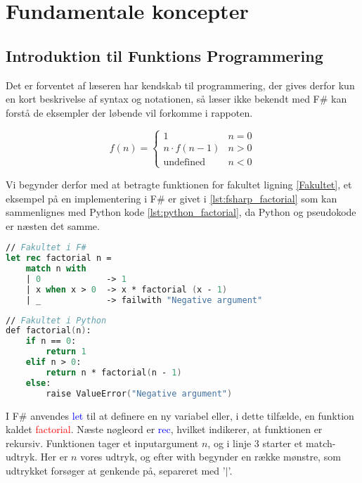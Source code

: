 
\section{Fundamentale koncepter}
\subsection{Introduktion til Funktions Programmering}

Det er forventet af læseren har kendskab til programmering, der gives derfor kun en kort beskrivelse af syntax og notationen, så læser ikke bekendt med F\# kan forstå de eksempler der løbende vil forkomme i rappoten.

\begin{equation}
    \label{Fakultet}
    f(n) = \begin{cases} 
            1 &  n = 0  \\
            n \cdot f(n-1) & n > 0 \\
            \text{undefined} & n < 0 
           \end{cases}
\end{equation}

Vi begynder derfor med at betragte funktionen for fakultet ligning \ref{Fakultet}, et eksempel på en implementering i F\# er givet i \ref{lst:fsharp_factorial} som kan sammenlignes med Python kode \ref{lst:python_factorial}, da Python og pseudokode er næsten det samme. 

\begin{lstlisting}[language={FSharp}, label={lst:fsharp_factorial}, caption={Eksempel på Fakultet i F\#}]
// Fakultet i F#
let rec factorial n =
    match n with
    | 0             -> 1 
    | x when x > 0  -> x * factorial (x - 1)
    | _             -> failwith "Negative argument"
\end{lstlisting}

\begin{lstlisting}[language={FSharp}, label={lst:python_factorial}, caption={Eksempel på Fakultet i Python}]
// Fakultet i Python
def factorial(n):
    if n == 0:
        return 1
    elif n > 0:
        return n * factorial(n - 1)
    else:
        raise ValueError("Negative argument")
\end{lstlisting}

I F\# anvendes \textcolor{blue}{let} til at definere en ny variabel eller, i dette tilfælde, en funktion kaldet \textcolor{red}{factorial}. Næste nøgleord er \textcolor{blue}{rec}, hvilket indikerer, at funktionen er rekursiv. Funktionen tager et inputargument \(n\), og i linje 3 starter et match-udtryk. Her er \(n\) vores udtryk, og efter \textcolor{codepurple}{with} begynder en række mønstre, som udtrykket forsøger at genkende på, separeret med '$\vert$'.

